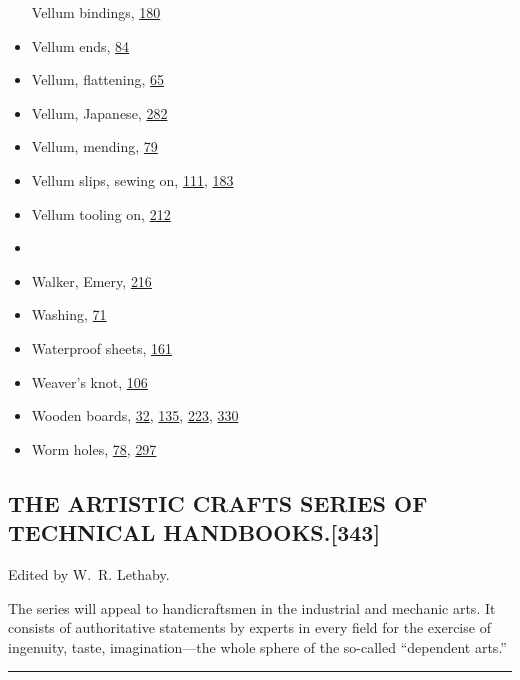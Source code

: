 \documentclass[
]{article}
\begin{document}
\begin{itemize}
  Vellum bindings, \protect\hyperlink{Page_180}{180}
\item
  Vellum ends, \protect\hyperlink{Page_84}{84}
\item
  Vellum, flattening, \protect\hyperlink{Page_65}{65}
\item
  Vellum, Japanese, \protect\hyperlink{Page_282}{282}
\item
  Vellum, mending, \protect\hyperlink{Page_79}{79}
\item
  Vellum slips, sewing on, \protect\hyperlink{Page_111}{111},
  \protect\hyperlink{Page_183}{183}
\item
  Vellum tooling on, \protect\hyperlink{Page_212}{212}
\item
  ~
\item
  {Walker}, Emery, \protect\hyperlink{Page_216}{216}
\item
  Washing, \protect\hyperlink{Page_71}{71}
\item
  Waterproof sheets, \protect\hyperlink{Page_161}{161}
\item
  Weaver's knot, \protect\hyperlink{Page_106}{106}
\item
  Wooden boards, \protect\hyperlink{Page_32}{32},
  \protect\hyperlink{Page_135}{135}, \protect\hyperlink{Page_223}{223},
  \protect\hyperlink{Page_330}{330}
\item
  Worm holes, \protect\hyperlink{Page_78}{78},
  \protect\hyperlink{Page_297}{297}
\end{itemize}

\hypertarget{the-artistic-crafts-series-of-technical-handbooks.343}{%
\subsection[THE ARTISTIC CRAFTS SERIES OF TECHNICAL
HANDBOOKS.]{\texorpdfstring{\protect\hypertarget{THE_ARTISTIC_CRAFTS_SERIES_OF}{}{}THE
ARTISTIC CRAFTS SERIES OF TECHNICAL
HANDBOOKS.{\protect\hypertarget{Page_343}{}{{[}343{]}}}}{THE ARTISTIC CRAFTS SERIES OF TECHNICAL HANDBOOKS.{[}343{]}}}\label{the-artistic-crafts-series-of-technical-handbooks.343}}

Edited by {W.~R. Lethaby}.

{The} series will appeal to handicraftsmen in the industrial and
mechanic arts. It consists of authoritative statements by experts in
every field for the exercise of ingenuity, taste, imagination---the
whole sphere of the so-called ``dependent arts.''

\begin{center}\rule{0.5\linewidth}{0.5pt}\end{center}
\end{document}
